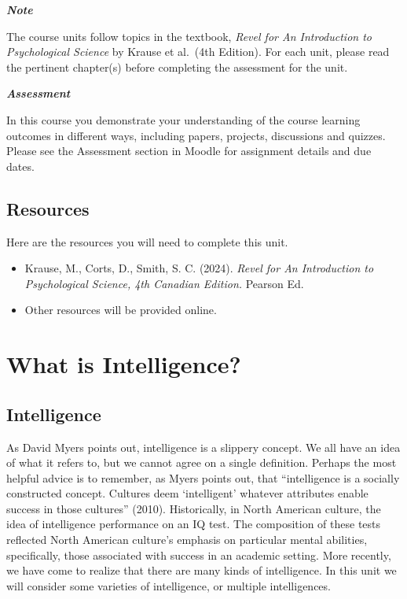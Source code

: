 \documentclass[
]{book}
\providecommand{\tightlist}{%
  \setlength{\itemsep}{0pt}\setlength{\parskip}{0pt}}
\begin{document}
\begin{caution}
\textbf{\emph{Note}}

The course units follow topics in the textbook, \emph{Revel for An Introduction to Psychological Science} by Krause et al.~(4th Edition). For each unit, please read the pertinent chapter(s) before completing the assessment for the unit.
\end{caution}

\begin{assessment}
\textbf{\emph{Assessment}}

In this course you demonstrate your understanding of the course learning outcomes in different ways, including papers, projects, discussions and quizzes. Please see the Assessment section in Moodle for assignment details and due dates.
\end{assessment}

\hypertarget{resources-1}{%
\subsection*{Resources}\label{resources-1}}

Here are the resources you will need to complete this unit.

\begin{itemize}
\tightlist
\item
  Krause, M., Corts, D., Smith, S. C. (2024). \emph{Revel for An Introduction to Psychological Science, 4th Canadian Edition.} Pearson Ed.\\
\item
  Other resources will be provided online.
\end{itemize}

\hypertarget{what-is-intelligence}{%
\section{What is Intelligence?}\label{what-is-intelligence}}

\hypertarget{intelligence}{%
\subsection*{Intelligence}\label{intelligence}}

As David Myers points out, intelligence is a slippery concept. We all have an idea of what it refers to, but we cannot agree on a single definition. Perhaps the most helpful advice is to remember, as Myers points out, that ``intelligence is a socially constructed concept. Cultures deem `intelligent' whatever attributes enable success in those cultures'' (2010). Historically, in North American culture, the idea of intelligence performance on an IQ test. The composition of these tests reflected North American culture's emphasis on particular mental abilities, specifically, those associated with success in an academic setting. More recently, we have come to realize that there are many kinds of intelligence. In this unit we will consider some varieties of intelligence, or multiple intelligences.
\end{document}
